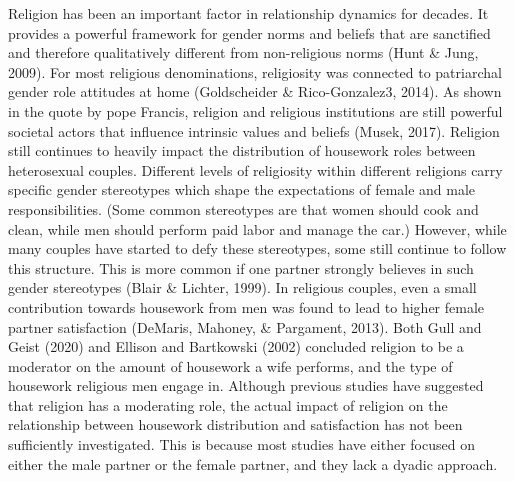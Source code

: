 \documentclass[
  man,floatsintext]{apa6}
\begin{document}
Religion has been an important factor in relationship dynamics for decades. It provides a powerful framework for gender norms and beliefs that are sanctified and therefore qualitatively different from non-religious norms (Hunt \& Jung, 2009). For most religious denominations, religiosity was connected to patriarchal gender role attitudes at home (Goldscheider \& Rico-Gonzalez3, 2014). As shown in the quote by pope Francis, religion and religious institutions are still powerful societal actors that influence intrinsic values and beliefs (Musek, 2017). Religion still continues to heavily impact the distribution of housework roles between heterosexual couples. Different levels of religiosity within different religions carry specific gender stereotypes which shape the expectations of female and male responsibilities.
(Some common stereotypes are that women should cook and clean, while men should perform paid labor and manage the car.)
However, while many couples have started to defy these stereotypes, some still continue to follow this structure. This is more common if one partner strongly believes in such gender stereotypes (Blair \& Lichter, 1999). In religious couples, even a small contribution towards housework from men was found to lead to higher female partner satisfaction (DeMaris, Mahoney, \& Pargament, 2013). Both Gull and Geist (2020) and Ellison and Bartkowski (2002) concluded religion to be a moderator on the amount of housework a wife performs, and the type of housework religious men engage in. Although previous studies have suggested that religion has a moderating role, the actual impact of religion on the relationship between housework distribution and satisfaction has not been sufficiently investigated. This is because most studies have either focused on either the male partner or the female partner, and they lack a dyadic approach.
\end{document}
